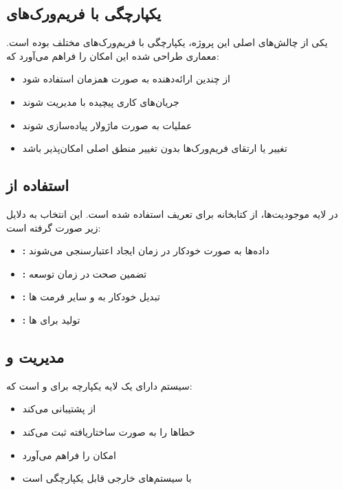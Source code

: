 \subsection{یکپارچگی با فریم‌ورک‌های }

یکی از چالش‌های اصلی این پروژه، یکپارچگی با فریم‌ورک‌های مختلف  بوده است. معماری طراحی شده این امکان را فراهم می‌آورد که:

\begin{itemize}
    \item از چندین ارائه‌دهنده  به صورت همزمان استفاده شود
    \item جریان‌های کاری پیچیده با  مدیریت شوند
    \item عملیات  به صورت ماژولار پیاده‌سازی شوند
    \item تغییر یا ارتقای فریم‌ورک‌ها بدون تغییر منطق اصلی امکان‌پذیر باشد
\end{itemize}

\subsection{استفاده از }

در لایه موجودیت‌ها، از کتابخانه  برای تعریف  استفاده شده است. این انتخاب به دلایل زیر صورت گرفته است:

\begin{itemize}
    \item \textbf{:} داده‌ها به صورت خودکار در زمان ایجاد  اعتبارسنجی می‌شوند
    \item \textbf{:} تضمین صحت  در زمان توسعه
    \item \textbf{:} تبدیل خودکار به  و سایر فرمت ها
    \item \textbf{:} تولید  برای ها
\end{itemize}

\subsection{مدیریت  و }

سیستم دارای یک لایه یکپارچه برای  و  است که:

\begin{itemize}
    \item از  پشتیبانی می‌کند
    \item خطاها را به صورت ساختاریافته ثبت می‌کند
    \item امکان  را فراهم می‌آورد
    \item با سیستم‌های  خارجی قابل یکپارچگی است
\end{itemize}

